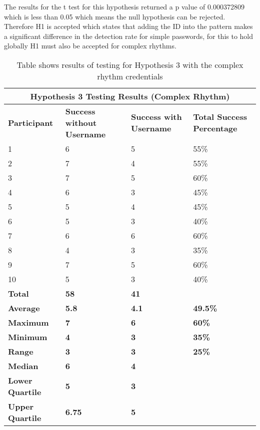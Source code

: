 \documentclass{article}
\begin{document}
The results for the t test for this hypothesis returned a p value of 0.000372809 which is less than 0.05 which means the null hypothesis can be rejected. Therefore H1 is accepted which states that adding the ID into the pattern makes a significant	difference in the detection	rate for simple passwords, for this to hold globally H1 must also be accepted for complex rhythms. 

{
\begin{table} [H]
\centering
\begin{tabular}{ |p{2cm}|p{4cm}|p{4cm}| p{4cm} | }
\hline
\multicolumn{4}{|c|}{\textbf{Hypothesis 3 Testing Results (Complex Rhythm)}} \\
\hline
\textbf{Participant} & \textbf{Success without Username} & \textbf{Success with Username} & \textbf{Total Success Percentage} \\
\hline
1 & 6 & 5 & 55\% \\
\hline
2 & 7 & 4 & 55\% \\
\hline
3 & 7 & 5 & 60\% \\
\hline
4 & 6 & 3 & 45\%  \\
\hline
5 & 5 & 4 & 45\% \\
\hline
6 & 5 & 3 & 40\% \\
\hline
7 & 6 & 6 & 60\% \\
\hline
8 & 4 & 3 & 35\% \\
\hline
9 & 7 & 5 & 60\% \\
\hline
10 & 5 & 3 & 40\% \\
\hline
\textbf{Total} & \textbf{58} & \textbf{41} & \\
\hline
\textbf{Average} & \textbf{5.8} & \textbf{4.1} & \textbf{49.5\%} \\
\hline
\textbf{Maximum} & \textbf{7} & \textbf{6} & \textbf{60\%} \\
\hline
\textbf{Minimum} & \textbf{4} & \textbf{3} & \textbf{35\%} \\
\hline
\textbf{Range} & \textbf{3} & \textbf{3} & \textbf{25\%} \\
\hline
\textbf{Median} & \textbf{6} & \textbf{4} & \\
\hline
\textbf{Lower Quartile} & \textbf{5} & \textbf{3} & \\
\hline
\textbf{Upper Quartile} & \textbf{6.75} & \textbf{5} & \\
\hline
\end{tabular}
\caption{Table shows results of testing for Hypothesis 3 with the complex rhythm credentials}
\label{table:4}
\end{table}
}
\end{document}
